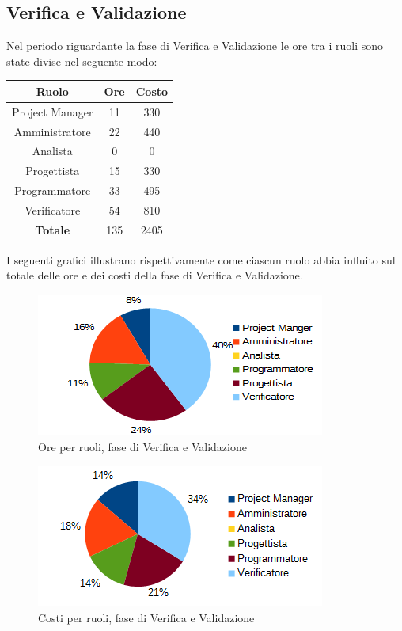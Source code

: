 	\subsection{Verifica e Validazione}
	Nel periodo riguardante la fase di Verifica e Validazione le ore tra i ruoli sono state divise nel seguente modo: \\
	\begin{table}[H]
		\centering
		\begin{tabular}{|c|c|c|}
			\hline
			\textbf{Ruolo}		& \textbf{Ore}	& \textbf{Costo} \\
			\hline
			Project Manager		& 11			& 330	\\
			Amministratore		& 22			& 440	\\
			Analista			& 0				& 0	\\
			Progettista			& 15			& 330	\\
			Programmatore		& 33			& 495	\\
			Verificatore		& 54			& 810	\\
			\hline
			\textbf{Totale}		& 135			& 2405	\\
			\hline
		\end{tabular}
		\end{table}
	I seguenti grafici illustrano rispettivamente come ciascun ruolo abbia influito sul totale
delle ore e dei costi della fase di Verifica e Validazione. \\
	\begin{figure}[H]
		\centering
		\includegraphics[scale=1]{immagini/grafici/validazione-torta.png}
		\caption{Ore per ruoli, fase di Verifica e Validazione}
	\end{figure}
	\begin{figure}[H]
		\centering
		\includegraphics[scale=1]{immagini/grafici/validazione-torta-costo.png}
		\caption{Costi per ruoli, fase di Verifica e Validazione}
	\end{figure}

